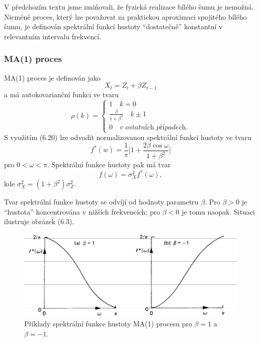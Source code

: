 V předchozím textu jsme zmiňovali, že fyzická realizace bílého šumu je nemožná. Nicméně proces, který lze považovat za praktickou aproximaci spojitého bílého šumu, je definován spektrální funkcí hustoty ``dostatečně'' konstantní v relevantním intervalu frekvencí.

\subsubsection{MA(1) proces}

MA(1) proces je definován jako
\begin{equation}
X_t = Z_t + \beta Z_{t-1}
\end{equation}
a má autokovarianční funkci ve tvaru
\begin{equation}
\rho(k) = 
\begin{cases}
1 \quad k = 0\\
\frac{\beta}{1 + \beta^2} \quad k \pm 1\\
0 \quad \textit{v ostatních případech}.
\end{cases}
\end{equation}
S využitím (6.20) lze odvodit normalizovanou spektrální funkci hustoty ve tvaru
\begin{equation}
f^*(w) = \frac{1}{\pi}\Big[1 + \frac{2 \beta \cos \omega}{1 + \beta^2}\Big]
\end{equation}
pro $0 < \omega < \pi$. Spektrální funkce hustoty pak má tvar
\begin{equation}
f(\omega) = \sigma_X^2 f^* (\omega),
\end{equation}
kde $\sigma_X^2 = (1 + \beta^2) \sigma_Z^2$.

Tvar spektrální funkce hustoty se odvíjí od hodnoty parametru $\beta$. Pro $\beta > 0$ je ``hustota'' koncentrována v nižších frekvencích; pro $\beta < 0$ je tomu naopak. Situaci ilustruje obrázek (6.3).

\begin{figure}[htp]
\centering
\includegraphics[scale = 0.50]{pictures/figure_6_3.eps}
\caption{Příklady spektrální funkce hustoty MA(1) procesu pro $\beta=1$ a $\beta=-1$.}
\label{figure_6_3}
\end{figure}

